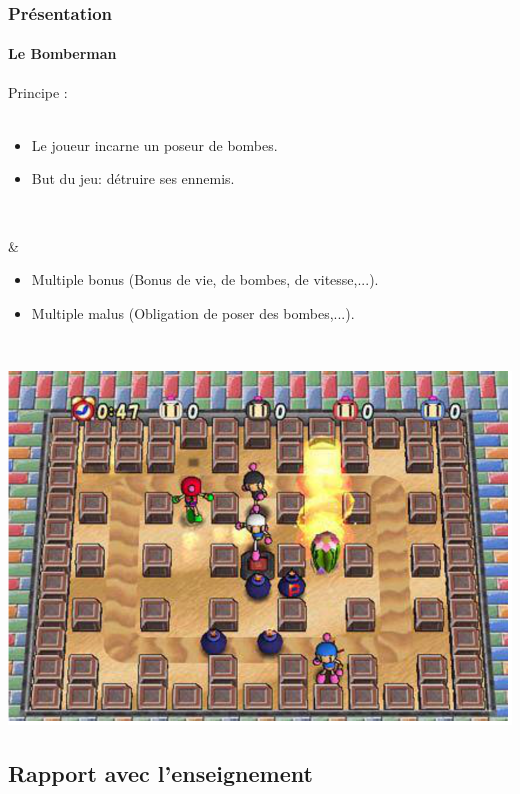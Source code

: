 \begin{frame}
\frametitle{Présentation}
\framesubtitle{Le Bomberman}
Principe : \\ \\

\begin{minipage}{5cm}
	\begin{itemize}
		\item Le joueur incarne un poseur de bombes.
		\item But du jeu: détruire ses ennemis.
	\end{itemize} \\
\end{minipage} &  \begin{minipage}{5.5cm}
	\begin{itemize}
		\item Multiple bonus (Bonus de vie, de bombes, de vitesse,...).
		\item Multiple malus (Obligation de poser des bombes,...).
	\end{itemize} \\
\end{minipage} 

\begin{center} \includegraphics[scale=0.35]{img/bomberman2.eps} \end{center}

\end{frame}


\subsection{Rapport avec l'enseignement}


